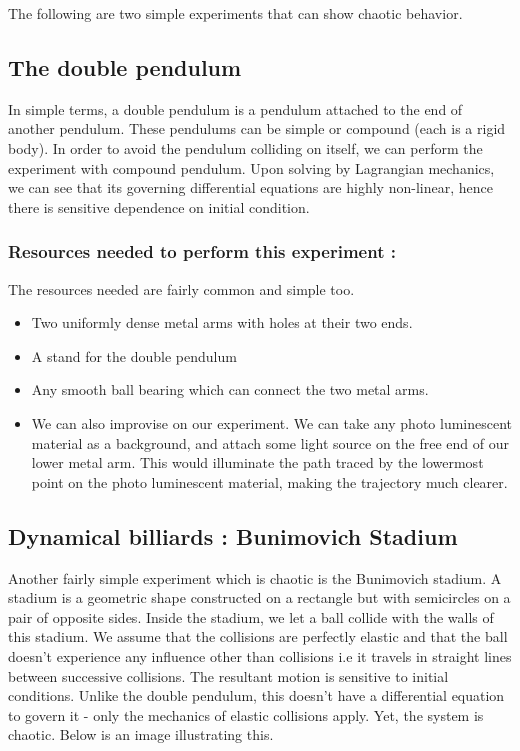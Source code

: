\documentclass{article}
\begin{document}
The following are two simple experiments that can show chaotic behavior.
\subsection*{The double pendulum }
In simple terms, a double pendulum is a pendulum attached to the end of another pendulum. These pendulums can be simple or compound (each is a rigid body). In order to avoid the pendulum colliding on itself, we can perform the experiment with compound pendulum. Upon solving by Lagrangian mechanics, we can see that its governing differential equations are highly non-linear, hence there is sensitive dependence on initial condition. 
\subsubsection*{Resources needed to perform this experiment : }
The resources needed are fairly common and simple too.
\begin{itemize}
    \item Two uniformly dense metal arms with holes at their two ends.
    \item A stand for the double pendulum
    \item Any smooth ball bearing which can connect the two metal arms.
    \item We can also improvise on our experiment. We can take any photo luminescent material as a background, and attach some light source on the free end of our lower metal arm. This would illuminate the path traced by the lowermost point on the photo luminescent material, making the trajectory much clearer.
\end{itemize}
\subsection*{Dynamical billiards : Bunimovich Stadium}
Another fairly simple experiment which is chaotic is the Bunimovich stadium. A stadium is a geometric shape constructed on a rectangle but with semicircles on a pair of opposite sides. Inside the stadium, we let a ball collide with the walls of this stadium. We assume that the collisions are perfectly elastic and that the ball doesn't experience any influence other than collisions i.e it travels in straight lines between successive collisions. The resultant motion is sensitive to initial conditions. Unlike the double pendulum, this doesn't have a differential equation to govern it - only the mechanics of elastic collisions apply. Yet, the system is chaotic. Below is an image illustrating this.
\end{document}
